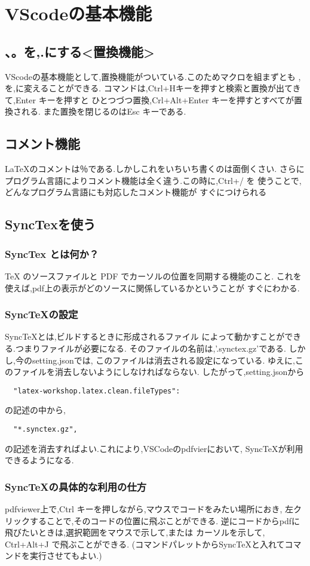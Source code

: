\documentclass{ltjsarticle}
\begin{document}
\section{VScodeの基本機能}
\subsection{、。を,.にする<置換機能>}
VScodeの基本機能として,置換機能がついている.このためマクロを組まずとも
,を,に変えることができる.
コマンドは,Ctrl+Hキーを押すと検索と置換が出てきて,Enter キーを押すと
ひとつづつ置換,Crl+Alt+Enter キーを押すとすべてが置換される.
また置換を閉じるのはEsc キーである.
\subsection{コメント機能}
\LaTeX のコメントは％である.しかしこれをいちいち書くのは面倒くさい.
さらにプログラム言語によりコメント機能は全く違う.この時に,Ctrl+/ を
使うことで,どんなプログラム言語にも対応したコメント機能が
すぐにつけられる
\subsection{SyncTexを使う}
\subsubsection*{SyncTex とは何か？}
TeX のソースファイルと PDF でカーソルの位置を同期する機能のこと.
これを使えば,pdf上の表示がどのソースに関係しているかということが
すぐにわかる.
\subsubsection*{SyncTeXの設定}
SyncTeXとは,ビルドするときに形成されるファイル
によって動かすことができる.つまりファイルが必要になる.
そのファイルの名前は,'.synctex.gz'である.
しかし,今のsetting.jsonでは,
このファイルは消去される設定になっている.
ゆえに,このファイルを消去しないようにしなければならない.
したがって,setting.jsonから
\begin{verbatim}
  "latex-workshop.latex.clean.fileTypes":
\end{verbatim}
の記述の中から,
\begin{verbatim}
  "*.synctex.gz",
\end{verbatim}
の記述を消去すればよい.これにより,VSCodeのpdfvierにおいて,
SyncTeXが利用できるようになる.
\subsubsection*{SyncTeXの具体的な利用の仕方}
pdfviewer上で,Ctrl キーを押しながら,マウスでコードをみたい場所におき,
左クリックすることで,そのコードの位置に飛ぶことができる.
逆にコードからpdfに飛びたいときは,選択範囲をマウスで示して,または
カーソルを示して, Ctrl+Alt+J で飛ぶことができる.
(コマンドパレットからSyncTeXと入れてコマンドを実行させてもよい.)
\end{document}
